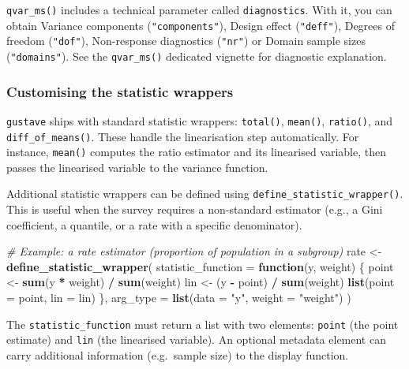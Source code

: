 \documentclass[
]{article}
\newenvironment{Shaded}{\begin{snugshade}}{\end{snugshade}}
\newcommand{\AttributeTok}[1]{\textcolor[rgb]{0.13,0.29,0.53}{#1}}
\newcommand{\CommentTok}[1]{\textcolor[rgb]{0.56,0.35,0.01}{\textit{#1}}}
\newcommand{\ControlFlowTok}[1]{\textcolor[rgb]{0.13,0.29,0.53}{\textbf{#1}}}
\newcommand{\FunctionTok}[1]{\textcolor[rgb]{0.13,0.29,0.53}{\textbf{#1}}}
\newcommand{\NormalTok}[1]{#1}
\newcommand{\OtherTok}[1]{\textcolor[rgb]{0.56,0.35,0.01}{#1}}
\newcommand{\SpecialCharTok}[1]{\textcolor[rgb]{0.81,0.36,0.00}{\textbf{#1}}}
\newcommand{\StringTok}[1]{\textcolor[rgb]{0.31,0.60,0.02}{#1}}
\begin{document}
\texttt{qvar\_ms()} includes a technical parameter called
\texttt{diagnostics}. With it, you can obtain Variance components
(\texttt{"components"}), Design effect (\texttt{"deff"}), Degrees of
freedom (\texttt{"dof"}), Non-response diagnostics (\texttt{"nr"}) or
Domain sample sizes (\texttt{"domains"}). See the \texttt{qvar\_ms()}
dedicated vignette for diagnostic explanation.

\subsubsection{Customising the statistic
wrappers}\label{customising-the-statistic-wrappers}

\texttt{gustave} ships with standard statistic wrappers:
\texttt{total()}, \texttt{mean()}, \texttt{ratio()}, and
\texttt{diff\_of\_means()}. These handle the linearisation step
automatically. For instance, \texttt{mean()} computes the ratio
estimator and its linearised variable, then passes the linearised
variable to the variance function.

Additional statistic wrappers can be defined using
\texttt{define\_statistic\_wrapper()}. This is useful when the survey
requires a non-standard estimator (e.g., a Gini coefficient, a quantile,
or a rate with a specific denominator).

\begin{Shaded}
\begin{Highlighting}[]
\CommentTok{\# Example: a rate estimator (proportion of population in a subgroup)}
\NormalTok{rate }\OtherTok{\textless{}{-}} \FunctionTok{define\_statistic\_wrapper}\NormalTok{(}
  \AttributeTok{statistic\_function =} \ControlFlowTok{function}\NormalTok{(y, weight) \{}
\NormalTok{    point }\OtherTok{\textless{}{-}} \FunctionTok{sum}\NormalTok{(y }\SpecialCharTok{*}\NormalTok{ weight) }\SpecialCharTok{/} \FunctionTok{sum}\NormalTok{(weight)}
\NormalTok{    lin   }\OtherTok{\textless{}{-}}\NormalTok{ (y }\SpecialCharTok{{-}}\NormalTok{ point) }\SpecialCharTok{/} \FunctionTok{sum}\NormalTok{(weight)}
    \FunctionTok{list}\NormalTok{(}\AttributeTok{point =}\NormalTok{ point, }\AttributeTok{lin =}\NormalTok{ lin)}
\NormalTok{  \},}
  \AttributeTok{arg\_type =} \FunctionTok{list}\NormalTok{(}\AttributeTok{data =} \StringTok{"y"}\NormalTok{, }\AttributeTok{weight =} \StringTok{"weight"}\NormalTok{)}
\NormalTok{)}
\end{Highlighting}
\end{Shaded}

The \texttt{statistic\_function} must return a list with two elements:
\texttt{point} (the point estimate) and \texttt{lin} (the linearised
variable). An optional metadata element can carry additional information
(e.g.~sample size) to the display function.
\end{document}
